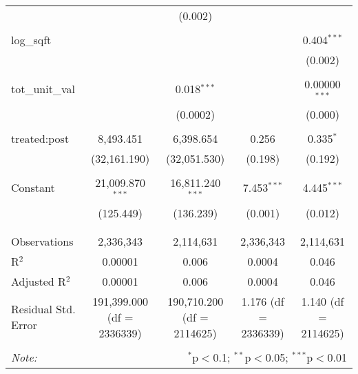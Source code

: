 \begin{table}[H]
{\begin{tabular}{@{\extracolsep{5pt}}lcccc}
   &  & (0.002) &  &  \\  

   & & & & \\  

  log\_sqft &  &  &  & 0.404$^{***}$ \\  

   &  &  &  & (0.002) \\  

   & & & & \\  

  tot\_unit\_val &  & 0.018$^{***}$ &  & 0.00000$^{***}$ \\  

   &  & (0.0002) &  & (0.000) \\  

   & & & & \\  

  treated:post & 8,493.451 & 6,398.654 & 0.256 & 0.335$^{*}$ \\  

   & (32,161.190) & (32,051.530) & (0.198) & (0.192) \\  

   & & & & \\  

  Constant & 21,009.870$^{***}$ & 16,811.240$^{***}$ & 7.453$^{***}$ & 4.445$^{***}$ \\  

   & (125.449) & (136.239) & (0.001) & (0.012) \\  

   & & & & \\  

 \hline \\[-1.8ex]  

 Observations & 2,336,343 & 2,114,631 & 2,336,343 & 2,114,631 \\  

 R$^{2}$ & 0.00001 & 0.006 & 0.0004 & 0.046 \\  

 Adjusted R$^{2}$ & 0.00001 & 0.006 & 0.0004 & 0.046 \\  

 Residual Std. Error & 191,399.000 (df = 2336339) & 190,710.200 (df = 2114625) & 1.176 (df = 2336339) & 1.140 (df = 2114625) \\  

 \hline  

 \hline \\[-1.8ex]  

 \textit{Note:}  & \multicolumn{4}{r}{$^{*}$p$<$0.1; $^{**}$p$<$0.05; $^{***}$p$<$0.01} \\  

 \end{tabular}}  

 \end{table}  

